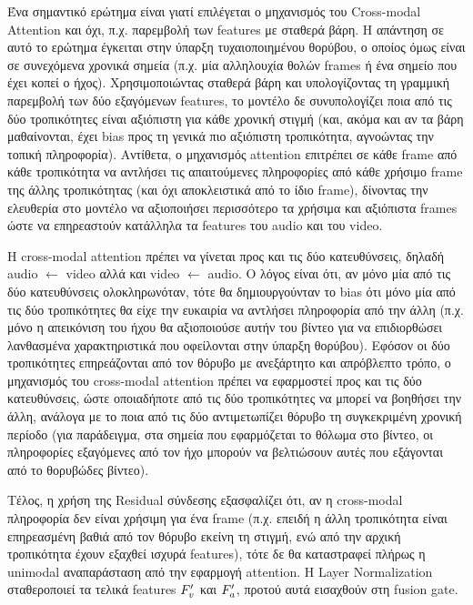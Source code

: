 Ένα σημαντικό ερώτημα είναι γιατί επιλέγεται ο μηχανισμός του Cross-modal Attention και όχι, π.χ. παρεμβολή των features με σταθερά βάρη. Η απάντηση σε αυτό το ερώτημα έγκειται στην ύπαρξη τυχαιοποιημένου θορύβου, ο οποίος όμως είναι σε συνεχόμενα χρονικά σημεία (π.χ. μία αλληλουχία θολών frames ή ένα σημείο που έχει κοπεί ο ήχος). Χρησιμοποιώντας σταθερά βάρη και υπολογίζοντας τη γραμμική παρεμβολή των δύο εξαγόμενων features, το μοντέλο δε συνυπολογίζει ποια από τις δύο τροπικότητες είναι αξιόπιστη για κάθε χρονική στιγμή (και, ακόμα και αν τα βάρη μαθαίνονται, έχει bias προς τη γενικά πιο αξιόπιστη τροπικότητα, αγνοώντας την τοπική πληροφορία). Αντίθετα, ο μηχανισμός attention επιτρέπει σε κάθε frame από κάθε τροπικότητα να αντλήσει τις απαιτούμενες πληροφορίες από κάθε χρήσιμο frame της άλλης τροπικότητας (και όχι αποκλειστικά από το ίδιο frame), δίνοντας την ελευθερία στο μοντέλο να αξιοποιήσει περισσότερο τα χρήσιμα και αξιόπιστα frames ώστε να επηρεαστούν κατάλληλα τα features του audio και του video.

Η cross-modal attention πρέπει να γίνεται προς και τις δύο κατευθύνσεις, δηλαδή audio $\leftarrow$ video αλλά και video $\leftarrow$ audio. Ο λόγος είναι ότι, αν μόνο μία από τις δύο κατευθύνσεις ολοκληρωνόταν, τότε θα δημιουργούνταν το bias ότι μόνο μία από τις δύο τροπικότητες θα είχε την ευκαιρία να αντλήσει πληροφορία από την άλλη (π.χ. μόνο η απεικόνιση του ήχου θα αξιοποιούσε αυτήν του βίντεο για να επιδιορθώσει λανθασμένα χαρακτηριστικά που οφείλονται στην ύπαρξη θορύβου). Εφόσον οι δύο τροπικότητες επηρεάζονται από τον θόρυβο με ανεξάρτητο και απρόβλεπτο τρόπο, ο μηχανισμός του cross-modal attention πρέπει να εφαρμοστεί προς και τις δύο κατευθύνσεις, ώστε οποιαδήποτε από τις δύο τροπικότητες να μπορεί να βοηθήσει την άλλη, ανάλογα με το ποια από τις δύο αντιμετωπίζει θόρυβο τη συγκεκριμένη χρονική περίοδο (για παράδειγμα, στα σημεία που εφαρμόζεται το θόλωμα στο βίντεο, οι πληροφορίες εξαγόμενες από τον ήχο μπορούν να βελτιώσουν αυτές που εξάγονται από το θορυβώδες βίντεο).

Τέλος, η χρήση της Residual σύνδεσης εξασφαλίζει ότι, αν η cross-modal πληροφορία δεν είναι χρήσιμη για ένα frame (π.χ. επειδή η άλλη τροπικότητα είναι επηρεασμένη βαθιά από τον θόρυβο εκείνη τη στιγμή, ενώ από την αρχική τροπικότητα έχουν εξαχθεί ισχυρά features), τότε δε θα καταστραφεί πλήρως η unimodal αναπαράσταση από την εφαρμογή attention. Η Layer Normalization σταθεροποιεί τα τελικά features $F_v\sp{\prime}$ και $F_a\sp{\prime}$, προτού αυτά εισαχθούν στη fusion gate.

